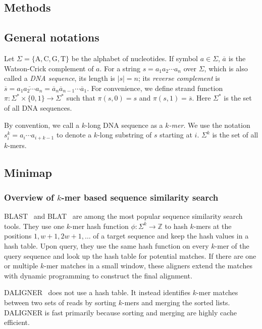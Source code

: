 \documentclass{bioinfo}
\begin{document}
\begin{methods}
\section{Methods}

\subsection{General notations}

Let $\Sigma=\{\mathrm{A},\mathrm{C},\mathrm{G},\mathrm{T}\}$ be the
alphabet of nucleotides. If symbol $a\in\Sigma$, $\overline{a}$ is the
Watson-Crick complement of $a$. For a string $s=a_1a_2\cdots a_n$ over
$\Sigma$, which is also called a \emph{DNA sequence}, its length is $|s|=n$;
its \emph{reverse complement} is $\overline{s}=\overline{a_1a_2\cdots
a_n}=\overline{a}_n\overline{a}_{n-1}\cdots\overline{a}_1$.
For convenience, we define strand function
$\pi:\Sigma^*\times\{0,1\}\to\Sigma^*$ such that $\pi(s,0)=s$ and
$\pi(s,1)=\overline{s}$. Here $\Sigma^*$ is the set of all DNA sequences.

By convention, we call a $k$-long DNA sequence as a \emph{$k$-mer}. We use the
notation $s^k_i=a_i\cdots a_{i+k-1}$ to denote a $k$-long substring of $s$
starting at $i$. $\Sigma^k$ is the set of all $k$-mers.

\subsection{Minimap}

\subsubsection{Overview of $k$-mer based sequence similarity search}\label{sec:minimapov}

BLAST~\citep{Altschul:1997vn} and BLAT~\citep{Kent:2002jk} are among the most
popular sequence similarity search tools. They use one $k$-mer hash function
$\phi:\Sigma^k\to\mathbb{Z}$ to hash $k$-mers at the positions
$1,w+1,2w+1,\ldots$ of a target sequence and keep the hash values in a hash
table. Upon query, they use the same hash function on every $k$-mer of the
query sequence and look up the hash table for potential matches. If there are
one or multiple $k$-mer matches in a small window, these aligners extend the
matches with dynamic programming to construct the final alignment.

DALIGNER~\citep{DBLP:conf/wabi/Myers14} does not use a hash table. It instead
identifies $k$-mer matches between two sets of reads by sorting $k$-mers and
merging the sorted lists. DALIGNER is fast primarily because sorting and
merging are highly cache efficient.


\end{methods}
\end{document}
